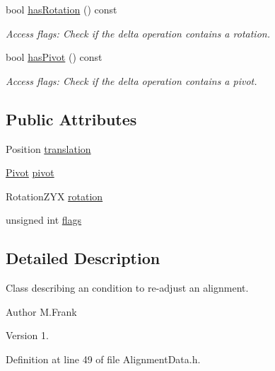 \begin{DoxyCompactItemize}
bool \hyperlink{class_d_d4hep_1_1_alignments_1_1_delta_a6fc6a8378f6229e0e8d89be1c3663e77}{has\+Rotation} () const
\begin{DoxyCompactList}\small\item\em Access flags\+: Check if the delta operation contains a rotation. \end{DoxyCompactList}\item 
bool \hyperlink{class_d_d4hep_1_1_alignments_1_1_delta_aee773271175ba4865205f990852e7e4b}{has\+Pivot} () const
\begin{DoxyCompactList}\small\item\em Access flags\+: Check if the delta operation contains a pivot. \end{DoxyCompactList}\end{DoxyCompactItemize}
\subsection*{Public Attributes}
\begin{DoxyCompactItemize}
\item 
Position \hyperlink{class_d_d4hep_1_1_alignments_1_1_delta_af53e050fbb66b78037d8ab20a59ff737}{translation}
\item 
\hyperlink{class_d_d4hep_1_1_alignments_1_1_delta_a9ff8cc825f916a4ae84f1780c11f2519}{Pivot} \hyperlink{class_d_d4hep_1_1_alignments_1_1_delta_acc2685bae6a2d77214b537136c31c653}{pivot}
\item 
Rotation\+Z\+YX \hyperlink{class_d_d4hep_1_1_alignments_1_1_delta_ae901fae9cfcb9b8dd337943adeda4f0b}{rotation}
\item 
unsigned int \hyperlink{class_d_d4hep_1_1_alignments_1_1_delta_a0d3375bd33c904430901e1ac3c1a1660}{flags}
\end{DoxyCompactItemize}


\subsection{Detailed Description}
Class describing an condition to re-\/adjust an alignment. 

\begin{DoxyAuthor}{Author}
M.\+Frank 
\end{DoxyAuthor}
\begin{DoxyVersion}{Version}
1. 
\end{DoxyVersion}


Definition at line 49 of file Alignment\+Data.\+h.



